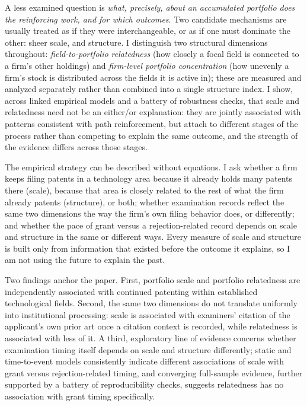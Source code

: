\documentclass[12pt]{article}
\begin{document}
A less examined question is \emph{what, precisely, about an accumulated portfolio does the reinforcing work, and for which outcomes}. Two candidate mechanisms are usually treated as if they were interchangeable, or as if one must dominate the other: sheer scale, and structure. I distinguish two structural dimensions throughout: \emph{field-to-portfolio relatedness} (how closely a focal field is connected to a firm's other holdings) and \emph{firm-level portfolio concentration} (how unevenly a firm's stock is distributed across the fields it is active in); these are measured and analyzed separately rather than combined into a single structure index. I show, across linked empirical models and a battery of robustness checks, that scale and relatedness need not be an either/or explanation: they are jointly associated with patterns consistent with path reinforcement, but attach to different stages of the process rather than competing to explain the same outcome, and the strength of the evidence differs across those stages.

The empirical strategy can be described without equations. I ask whether a firm keeps filing patents in a technology area because it already holds many patents there (scale), because that area is closely related to the rest of what the firm already patents (structure), or both; whether examination records reflect the same two dimensions the way the firm's own filing behavior does, or differently; and whether the pace of grant versus a rejection-related record depends on scale and structure in the same or different ways. Every measure of scale and structure is built only from information that existed before the outcome it explains, so I am not using the future to explain the past.

Two findings anchor the paper. First, portfolio scale and portfolio relatedness are independently associated with continued patenting within established technological fields. Second, the same two dimensions do not translate uniformly into institutional processing: scale is associated with examiners' citation of the applicant's own prior art once a citation context is recorded, while relatedness is associated with less of it. A third, exploratory line of evidence concerns whether examination timing itself depends on scale and structure differently; static and time-to-event models consistently indicate different associations of scale with grant versus rejection-related timing, and converging full-sample evidence, further supported by a battery of reproducibility checks, suggests relatedness has no association with grant timing specifically.
\end{document}
